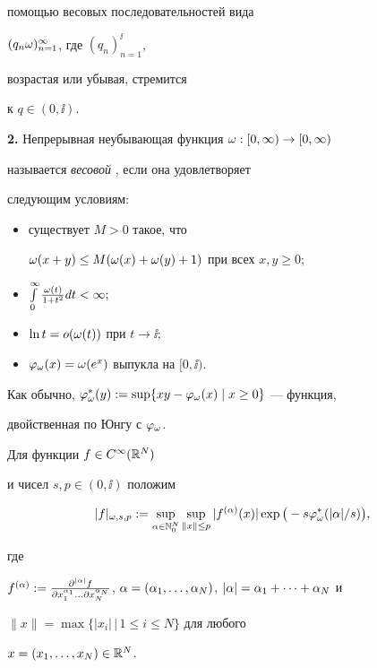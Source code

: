 помощью весовых последовательностей вида 


$(q_n\omega)_{n=1}^{\infty}$, где $(q_n)_{n=1}^{\ii}$,


возрастая или убывая, стремится 


к $q\in (0,\ii)$. 


\medskip





{\bf 2.} Непрерывная неубывающая функция $\omega :[0,\infty)\rightarrow[0,\infty)$


называется {\it весовой} \cite{Bon89}, если она удовлетворяет 


следующим условиям:


\begin{itemize}


\item[($\a$)] существует $M>0$ такое, что


$\omega(x+y)\le M(\omega(x)+\omega(y)+1)$ при всех $x,y\ge 0;$


\item[($\beta$)] $\int\limits_0^\infty\frac{\omega(t)}{1+t^2}dt<\infty;$


\item[($\g$)] $\ln t=o(\omega(t))$ при $t\to\ii;$


\item[($\d$)] $\varphi_\omega(x)=\omega(e^x)$ выпукла на $[0,\ii).$


\end{itemize}


Как обычно, $\varphi_{\omega}^{*}(y):=\sup\{xy-\varphi_{\omega}(x)\mid x\ge 0\}$ --- функция,


двойственная по Юнгу с $\varphi_\omega$.





Для функции $f\in C^{\infty}(\Bbb R^N)$


и чисел $s,p\in (0,\ii)$ положим


$$


|f|_{\o,s,p}:=\sup_{\a\in \N_0^N}\sup_{\|x\|\le p}|f^{(\a)}(x)|\exp\big(-s


\vvi(|\a|/s)\big),


$$


где


$f^{(\a)}:=\frac{\partial^{|\a|}f}{ \partial x_1^{\a_1}\dotsc\partial


x_N^{\a_N}}$, $\a=(\a_1,\dotsc,\a_N)$, $|\a|=\a_1+\dotsb+\a_N$ и


$\|x\|=\max\{|x_i|\,\big|\,1\le i\le N\}$ для любого 


$x=(x_1,\dotsc,x_N)\in \Bbb R^N$.


